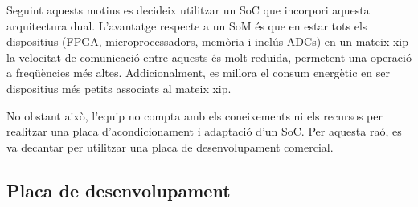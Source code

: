 {    Seguint aquests motius es decideix utilitzar un SoC que incorpori aquesta
    arquitectura dual. L'avantatge respecte a un SoM és que en estar tots els
    dispositius (FPGA, microprocessadors, memòria i inclús ADCs) en un mateix
    xip la velocitat de comunicació entre aquests és molt reduida, permetent
    una operació a freqüències més altes. Addicionalment, es millora el consum
    energètic en ser dispositius més petits associats al mateix xip.

    No obstant això, l'equip no compta amb els coneixements ni els recursos per
    realitzar una placa d'acondicionament i adaptació d'un SoC. Per aquesta
    raó, es va decantar per utilitzar una placa de desenvolupament comercial.
}

\subsection{ Placa de desenvolupament }
